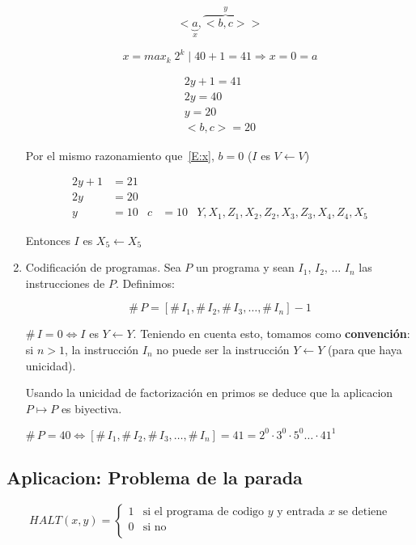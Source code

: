 \begin{enumerate}
\begin{example}
		\[
			<\underbrace{a}_{x}, \overbrace{<b, c>}^{y}>		
		\]
		
		\begin{equation}\label{E:x}
			x = max_{k} \; 2^k \mid 40 + 1 = 41 \Rightarrow x = 0 = a
		\end{equation}
					
		\begin{align*}
		 2y + 1 = 41		\\
		 2y		= 40		\\
		 y		= 20		\\
		 <b, c>	= 20
		\end{align*}
		
		Por el mismo razonamiento que~\eqref{E:x}, $b = 0$ ($I$ es $V \leftarrow V$)
		
		\begin{align*}
		 2y + 1 &= 21		&		 &													\\
		 2y		&= 20		&		 &													\\
		 y		&= 10		& c &= 10 & Y, X_1, Z_1, X_2, Z_2, X_3, Z_3, X_4, Z_4, X_5
		\end{align*}
		
		Entonces $I$ es $X_5 \leftarrow X_5$
		
	\end{example}
	\item Codificaci\'on de programas. Sea $P$ un programa y sean $I_1$, $I_2$, $\ldots$ $I_n$ las instrucciones de $P$. Definimos:
	
	\[
		\#\,P = [\#\,I_1, \#\,I_2, \#\,I_3, \ldots, \#\,I_n] - 1
	\]
	\noindent
	\begin{observation}
	$\#\,I = 0 \iff I$ es $Y \leftarrow Y$. Teniendo en cuenta esto, tomamos como \textbf{convenci\'on}: si $n > 1$, la instrucci\'on $I_n$ no puede ser la instrucci\'on $Y \leftarrow Y$ (para que haya unicidad).
	
	Usando la unicidad de factorizaci\'on en primos se deduce que la aplicacion $P \mapsto P$ es biyectiva.
	\end{observation}
	
	\begin{example}
	$\# \, P = 40 \iff [\#\,I_1, \#\,I_2, \#\,I_3, \ldots, \#\,I_n] = 41 = 2^0 \cdot 3^0 \cdot 5^0 \ldots \cdot 41^1$
	\end{example}
\end{enumerate}
 
\subsection{Aplicacion: Problema de la parada}
\hfill
\[
HALT(x, y) =
\begin{cases}
1				&\text{si el programa de codigo $y$ y entrada $x$ se detiene} \\
0				&\text{si no}												\\
\end{cases}
\]
 
